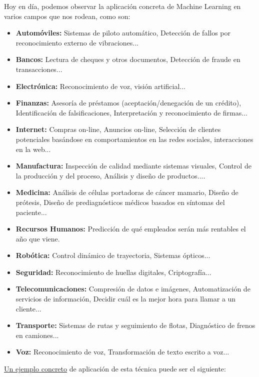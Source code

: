 \documentclass[a4paper, 11pt]{article} %
\begin{document}
Hoy en día, podemos observar la aplicación concreta de Machine Learning en varios campos que nos rodean, como son:
		\begin{itemize}
		    \item \textbf{Automóviles:} Sistemas de piloto automático, Detección de fallos por reconocimiento externo de vibraciones...
		    \item \textbf{Bancos:} Lectura de cheques y otros documentos, Detección de fraude en transacciones...
		    \item \textbf{Electrónica:} Reconocimiento de voz, visión artificial...
		    \item \textbf{Finanzas:} Asesoría de préstamos (aceptación/denegación de un crédito), Identificación de falsificaciones, Interpretación y reconocimiento de firmas...
		    \item \textbf{Internet:} Compras on-line, Anuncios on-line, Selección de clientes potenciales basándose en comportamientos en las redes sociales, interacciones en la web...
		    \item \textbf{Manufactura:}  Inspección de calidad mediante sistemas visuales, Control de la producción y del proceso, Análisis y diseño de productos....
		    \item \textbf{Medicina:} Análisis de células portadoras de cáncer mamario, Diseño de prótesis, Diseño de prediagnósticos médicos basados en síntomas del paciente...
		    \item \textbf{Recursos Humanos:} Predicción de qué empleados serán más rentables el año que viene.
		    \item \textbf{Robótica:} Control dinámico de trayectoria, Sistemas ópticos...
		    \item \textbf{Seguridad:} Reconocimiento de huellas digitales, Criptografía...		\item \textbf{Telecomunicaciones:} Compresión de datos e imágenes, Automatización de servicios de información, Decidir cuál es la mejor hora para llamar a un cliente...
		    \item \textbf{Transporte:} Sistemas de rutas y seguimiento de flotas, Diagnóstico de frenos en camiones...
		    \item \textbf{Voz:} Reconocimiento de voz, Transformación de texto escrito a voz...
		\end{itemize}
		
\underline{Un ejemplo concreto} de aplicación de esta técnica puede ser el siguiente:
\end{document}
